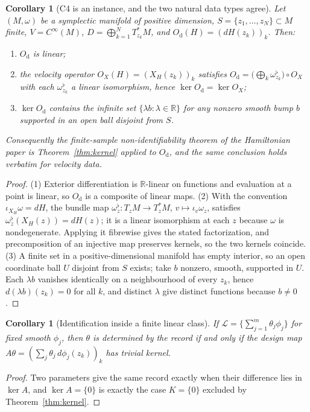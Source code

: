 \documentclass[11pt]{article}
\newtheorem{corollary}[definition]{Corollary}
\theoremstyle{definition}
\begin{document}
\begin{corollary}[C4 is an instance, and the two natural data types agree]
\label{cor:c4}
Let $(M,\omega)$ be a symplectic manifold of positive dimension,
$S=\{z_1,\dots,z_N\}\subset M$ finite, $V=C^\infty(M)$,
$D=\bigoplus_{k=1}^N T^*_{z_k}M$, and $O_{\mathrm d}(H)=(dH(z_k))_k$. Then:
\begin{enumerate}
\item $O_{\mathrm d}$ is linear;
\item the velocity operator $O_{X}(H)=(X_H(z_k))_k$ satisfies
      $O_{\mathrm d}=\bigl(\bigoplus_k\omega^\flat_{z_k}\bigr)\circ O_X$ with each
      $\omega^\flat_{z_k}$ a linear isomorphism, hence
      $\ker O_{\mathrm d}=\ker O_X$;
\item $\ker O_{\mathrm d}$ contains the infinite set $\{\lambda b:\lambda\in\mathbb R\}$
      for any nonzero smooth bump $b$ supported in an open ball disjoint
      from $S$.
\end{enumerate}
Consequently the finite-sample non-identifiability theorem of the Hamiltonian
paper is Theorem~\ref{thm:kernel} applied to $O_{\mathrm d}$, and the same
conclusion holds verbatim for velocity data.
\end{corollary}
\begin{proof}
(1) Exterior differentiation is $\mathbb R$-linear on functions and evaluation
at a point is linear, so $O_{\mathrm d}$ is a composite of linear maps.
(2) With the convention $\iota_{X_H}\omega=dH$, the bundle map
$\omega^\flat_z:T_zM\to T^*_zM$, $v\mapsto\iota_v\omega_z$, satisfies
$\omega^\flat_z(X_H(z))=dH(z)$; it is a linear isomorphism at each $z$ because
$\omega$ is nondegenerate. Applying it fibrewise gives the stated factorization,
and precomposition of an injective map preserves kernels, so the two kernels
coincide.
(3) A finite set in a positive-dimensional manifold has empty interior, so an
open coordinate ball $U$ disjoint from $S$ exists; take $b$ nonzero, smooth,
supported in $U$. Each $\lambda b$ vanishes identically on a neighbourhood of
every $z_k$, hence $d(\lambda b)(z_k)=0$ for all $k$, and distinct $\lambda$
give distinct functions because $b\neq0$.
\end{proof}

\begin{corollary}[Identification inside a finite linear class]
\label{cor:linear}
If $\mathcal L=\{\sum_{j=1}^m\theta_j\phi_j\}$ for fixed smooth $\phi_j$, then
$\theta$ is determined by the record if and only if the design map
$A\theta=(\sum_j\theta_j\,d\phi_j(z_k))_k$ has trivial kernel.
\end{corollary}
\begin{proof}
Two parameters give the same record exactly when their difference lies in
$\ker A$, and $\ker A=\{0\}$ is exactly the case $K=\{0\}$ excluded by
Theorem~\ref{thm:kernel}.
\end{proof}
\end{document}
